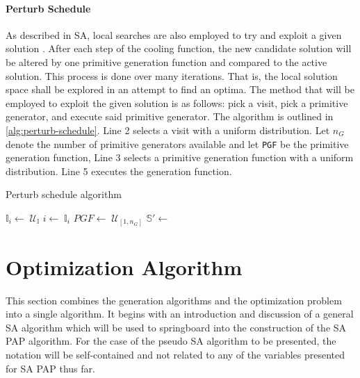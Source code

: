 \documentclass[11pt,a4paper,final]{article}
\newcommand{\I}{\mathbb{I}}                 %
\newcommand{\C}{\mathbb{C}}                 %
\newcommand{\U}{\mathcal{U}}                %
\newcommand{\Sol}{\mathbb{S}}               %
\begin{document}
\paragraph{Perturb Schedule}
\label{sec:tweak-schedule}
As described in SA, local searches are also employed to try and exploit a given solution
\cite{radosavljevic-2018-metah-optim}. After each step of the cooling function, the new candidate solution will be
altered by one primitive generation function and compared to the active solution. This process is done over many
iterations. That is, the local solution space shall be explored in an attempt to find an optima. The method that will be
employed to exploit the given solution is as follows: pick a visit, pick a primitive generator, and execute said
primitive generator. The algorithm is outlined in \ref{alg:perturb-schedule}. Line 2 selects a visit with a uniform
distribution. Let \(n_G\) denote the number of primitive generators available and let \texttt{PGF} be the primitive generation
function, Line 3 selects a primitive generation function with a uniform distribution. Line 5 executes the generation
function.

\begin{algorithm}[H]
\caption{Perturb schedule algorithm} \label{alg:perturb-schedule}

    \LinesNumbered
    \KwIn{$\I$, $\C$}
    \KwOut{$\I_i'$, $\C'$}


    \Begin
    {
        $\I_i\leftarrow\; \U_{\I}$
        $i \leftarrow\; \I_i$
        $PGF \leftarrow\; \U_{[1,n_G]}$
        $\Sol' \leftarrow$ \PGF{($i$, $\I$, $\C$)}
        \Return{($\I'$, $\C'$)}
    }
\end{algorithm}
\section{Optimization Algorithm}
\label{sec:optimization-algorithm}
This section combines the generation algorithms and the optimization problem into a single algorithm. It begins with an
introduction and discussion of a general SA algorithm which will be used to springboard into the construction of the SA
PAP algorithm. For the case of the pseudo SA algorithm to be presented, the notation will be self-contained and not
related to any of the variables presented for SA PAP thus far.
\end{document}
